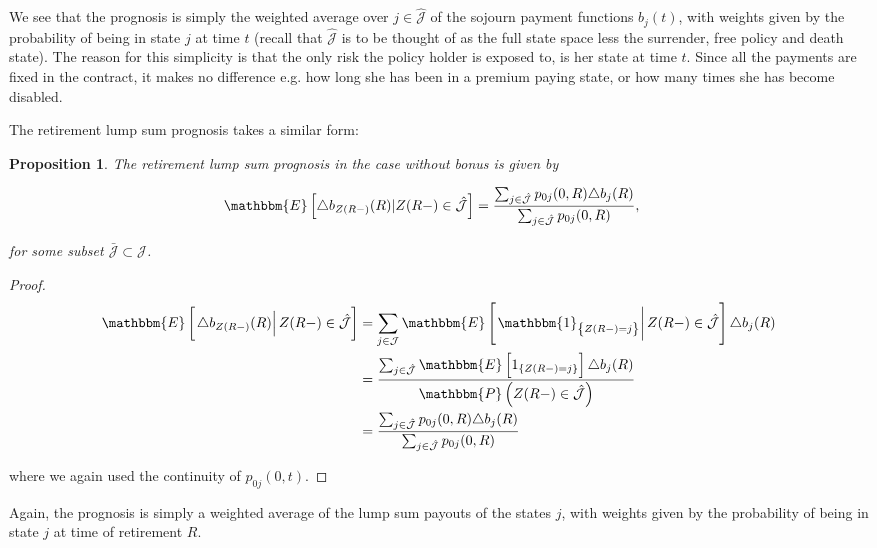\documentclass{book}
\newcommand{\1}[1]{\mathbbm{1}_{\left\lbrace #1 \right\rbrace}}
\newcommand{\expec}[1][def]{\mathbbm{E} \left[ #1 \right]}
\newcommand{\econd}[2][def]{\mathbbm{E} \left[ \left. #1 \right| #2 \right]}
\newcommand{\probability}[1][def]{\mathbbm{P} \left( #1 \right)}
\theoremstyle{break}
\newtheorem{proposition}[definition]{Proposition}%
\theoremstyle{remark}
\numberwithin{equation}{section}
\begin{document}
We see that the prognosis is simply the weighted average over $j \in \hat{\mathcal{J}}$ of the sojourn payment functions $b_j(t)$, with weights given by the probability of being in state $j$ at time $t$ (recall that $\hat{\mathcal{J}}$ is to be thought of as the full state space less the surrender, free policy and death state). The reason for this simplicity is that the only risk the policy holder is exposed to, is her state at time $t$. Since all the payments are fixed in the contract, it makes no difference e.g. how long she has been in a premium paying state, or how many times she has become disabled.

The retirement lump sum prognosis takes a similar form:

\begin{proposition} \label{RetireWithoutBonus}
The retirement lump sum prognosis in the case without bonus is given by

\begin{align*}
    \expec[ \triangle b_{Z(R-)}(R) | Z(R-) \in \hat{\mathcal{J}}]
    &= \frac{\sum_{j \in \hat{\mathcal{J}}} p_{0j}(0,R) \triangle b_j(R)}{\sum_{j \in \hat{\mathcal{J}}} p_{0j}(0,R)},
\end{align*}

for some subset $\bar{\mathcal{J}} \subset \mathcal{J}$.
\end{proposition}

\begin{proof}
\begin{align*}
	\econd[\triangle b_{Z(R-)}(R)]{Z(R-) \in \hat{\mathcal{J}}} &= \sum_{j \in \mathcal{J}} \econd[\1{Z(R-)=j}]{Z(R-) \in \hat{\mathcal{J}}} \triangle b_j(R) \\
	&= \frac{\sum_{j \in \hat{\mathcal{J}}} \expec[ 1_{\{Z(R-)=j\}} ] \triangle b_j(R)}{\probability[Z(R-) \in \hat{\mathcal{J}}]} \\
	&= \frac{\sum_{j \in \hat{\mathcal{J}}} p_{0j}(0,R) \triangle b_j(R)}{\sum_{j \in \hat{\mathcal{J}}} p_{0j}(0,R)}
\end{align*}

where we again used the continuity of $p_{0j}(0,t)$.
\end{proof}

Again, the prognosis is simply a weighted average of the lump sum payouts of the states $j$, with weights given by the probability of being in state $j$ at time of retirement $R$.
\end{document}
